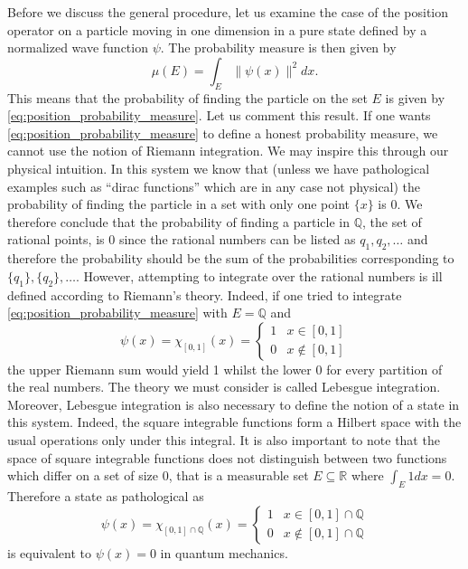 \documentclass{article}
\begin{document}
Before we discuss the general procedure, let us examine the case of the position operator on a particle moving in one dimension in a pure state defined by a normalized wave function $\psi$. The probability measure is then given by
\begin{equation}\label{eq:position_probability_measure}
\mu(E)=\int_E \|\psi(x)\|^2dx.
\end{equation}
This means that the probability of finding the particle on the set $E$ is given by \eqref{eq:position_probability_measure}. Let us comment this result. If one wants \eqref{eq:position_probability_measure} to define a honest probability measure, we cannot use the notion of Riemann integration. We may inspire this through our physical intuition. In this system we know that (unless we have pathological examples such as ``dirac functions'' which are in any case not physical) the probability of finding the particle in a set with only one point $\{x\}$ is $0$. We therefore conclude that the probability of finding a particle in $\mathbb{Q}$, the set of rational points, is $0$ since the rational numbers can be listed as $q_1,q_2,\dots$ and therefore the probability should be the sum of the probabilities corresponding to $\{q_1\},\{q_2\},\dots$. However, attempting to integrate over the rational numbers is ill defined according to Riemann's theory. Indeed, if one tried to integrate \eqref{eq:position_probability_measure} with $E=\mathbb{Q}$ and 
\begin{equation}
\psi(x)=\chi_{[0,1]}(x)=\begin{cases}
1 & x\in [0,1]\\
0 & x\not\in [0,1]
\end{cases}
\end{equation} 
the upper Riemann sum would yield 1 whilst the lower 0 for every partition of the real numbers. The theory we must consider is called Lebesgue integration. Moreover, Lebesgue integration is also necessary to define the notion of a state in this system. Indeed, the square integrable functions form a Hilbert space with the usual operations only under this integral. It is also important to note that the space of square integrable functions does not distinguish between two functions which differ on a set of size $0$, that is a measurable set $E\subseteq\mathbb{R}$ where $\int_E 1dx=0$. Therefore a state as pathological as 
\begin{equation}
\psi(x)=\chi_{[0,1]\cap\mathbb{Q}}(x)=\begin{cases}
1 & x\in [0,1]\cap\mathbb{Q}\\
0 & x\not\in [0,1]\cap\mathbb{Q}
\end{cases}
\end{equation}
is equivalent to $\psi(x)=0$ in quantum mechanics.
\end{document}
